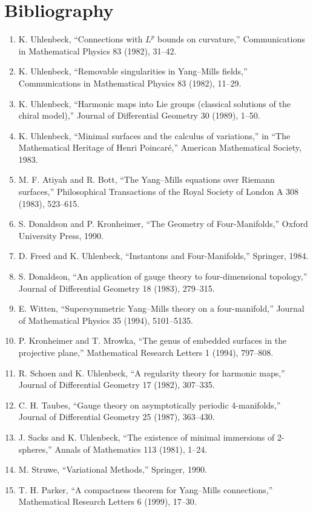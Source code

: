 \section*{Bibliography}
\begin{enumerate}
\item K. Uhlenbeck, ``Connections with $L^p$ bounds on curvature,'' Communications in Mathematical Physics 83 (1982), 31--42.
\item K. Uhlenbeck, ``Removable singularities in Yang--Mills fields,'' Communications in Mathematical Physics 83 (1982), 11--29.
\item K. Uhlenbeck, ``Harmonic maps into Lie groups (classical solutions of the chiral model),'' Journal of Differential Geometry 30 (1989), 1--50.
\item K. Uhlenbeck, ``Minimal surfaces and the calculus of variations,'' in ``The Mathematical Heritage of Henri Poincar\'e,'' American Mathematical Society, 1983.
\item M. F. Atiyah and R. Bott, ``The Yang--Mills equations over Riemann surfaces,'' Philosophical Transactions of the Royal Society of London A 308 (1983), 523--615.
\item S. Donaldson and P. Kronheimer, ``The Geometry of Four-Manifolds,'' Oxford University Press, 1990.
\item D. Freed and K. Uhlenbeck, ``Instantons and Four-Manifolds,'' Springer, 1984.
\item S. Donaldson, ``An application of gauge theory to four-dimensional topology,'' Journal of Differential Geometry 18 (1983), 279--315.
\item E. Witten, ``Supersymmetric Yang--Mills theory on a four-manifold,'' Journal of Mathematical Physics 35 (1994), 5101--5135.
\item P. Kronheimer and T. Mrowka, ``The genus of embedded surfaces in the projective plane,'' Mathematical Research Letters 1 (1994), 797--808.
\item R. Schoen and K. Uhlenbeck, ``A regularity theory for harmonic maps,'' Journal of Differential Geometry 17 (1982), 307--335.
\item C. H. Taubes, ``Gauge theory on asymptotically periodic 4-manifolds,'' Journal of Differential Geometry 25 (1987), 363--430.
\item J. Sacks and K. Uhlenbeck, ``The existence of minimal immersions of 2-spheres,'' Annals of Mathematics 113 (1981), 1--24.
\item M. Struwe, ``Variational Methods,'' Springer, 1990.
\item T. H. Parker, ``A compactness theorem for Yang--Mills connections,'' Mathematical Research Letters 6 (1999), 17--30.

\end{enumerate}

